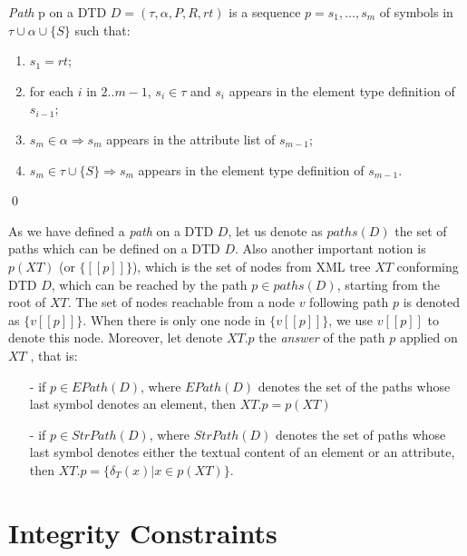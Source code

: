 \begin{define}[Path]
{\sl Path} p on a DTD $D = (\tau, \alpha, P, R, rt)$ is a sequence $p = s_1, \dots, s_m$ of symbols in $\tau \cup \alpha \cup \{S\}$ such that:
	\begin{enumerate}
		\item $s_1=rt$;
		\item for each $i$ in $2..m-1$, $s_i \in \tau$ and $s_i$ appears in the element type definition of $s_{i-1}$;
		\item $s_m \in \alpha \Rightarrow s_m$ appears in the attribute list of $s_{m-1}$;
		\item $s_m \in \tau \cup \{S\} \Rightarrow s_m$ appears in the element type definition of $s_{m-1}$.
	\end{enumerate}\qed
\end{define}

As we have defined a \emph{path} on a DTD $D$, let us denote as $paths(D)$ the set of paths which can be defined on a DTD $D$. Also another important notion is $p(XT)$ (or $\{[\![p]\!]\}$), which is the set of nodes from XML tree $XT$ conforming DTD $D$, which can be reached by the path $p \in paths(D)$, starting from the root of $XT$. The set of nodes reachable from a node $v$ following path $p$ is denoted as $\{v[\![p]\!]\}$. When there is only one node in $\{v[\![p]\!]\}$, we use $v[\![p]\!]$ to denote this node. Moreover, let denote $XT.p$ the \emph{answer} of the path $p$ applied on $XT$ , that is:
\begin{itemize}
	\item[-] if $p \in EPath(D)$, where $EPath(D)$ denotes the set of the paths whose last symbol denotes an element, then $XT.p = p(XT)$
	\item[-] if $p \in StrPath(D)$, where $StrPath(D)$ denotes the set of paths whose last symbol denotes either the textual content of an element or an
attribute, then $XT.p = \{\delta_T(x)|x \in p(XT)\}$.
\end{itemize}

\section{Integrity Constraints}

